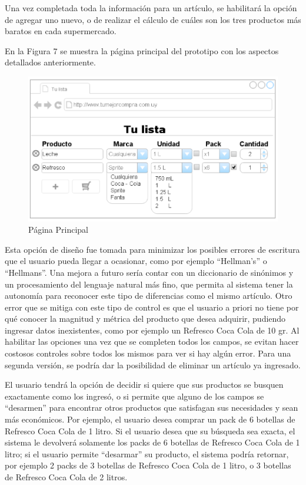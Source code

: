\documentclass[12pt]{article} %
\begin{document}
Una vez completada toda la información para un artículo, se habilitará la opción de agregar uno nuevo, o de realizar el cálculo de cuáles son los tres productos más baratos en cada supermercado.

En la Figura 7 se muestra la página principal del prototipo con los aspectos detallados anteriormente.

\begin{figure}[H]
\includegraphics[scale=.90]{interfaz_usuario}
\centering
\caption{Página Principal}
\end{figure}

Esta opción de diseño fue tomada para minimizar los posibles errores de escritura que el usuario pueda llegar a ocasionar, como por ejemplo “Hellman’s” o “Hellmans”. Una mejora a futuro sería contar con un diccionario de sinónimos y un procesamiento del lenguaje natural más fino, que permita al sistema tener la autonomía para reconocer este tipo de diferencias como el mismo artículo. Otro error que se mitiga con este tipo de control es que el usuario a priori no tiene por qué conocer la magnitud y métrica del producto que desea adquirir, pudiendo ingresar datos inexistentes, como por ejemplo un Refresco Coca Cola de 10 gr. Al habilitar las opciones una vez que se completen todos los campos, se evitan hacer costosos controles sobre todos los mismos para ver si hay algún error. Para una segunda versión, se podría dar la posibilidad de eliminar un artículo ya ingresado.

El usuario tendrá la opción de decidir si quiere que sus productos se busquen exactamente como los ingresó, o si permite que alguno de los campos se “desarmen” para encontrar otros productos que satisfagan sus necesidades y sean más económicos. 
Por ejemplo, el usuario desea comprar un pack de 6 botellas de Refresco Coca Cola de 1 litro. Si el usuario desea que su búsqueda sea exacta, el sistema le devolverá solamente los packs de 6 botellas de Refresco Coca Cola de 1 litro; si el usuario permite “desarmar” su producto, el sistema podría retornar, por ejemplo 2 packs de 3 botellas de Refresco Coca Cola de 1 litro, o 3 botellas de Refresco Coca Cola de 2 litros.
\end{document}
